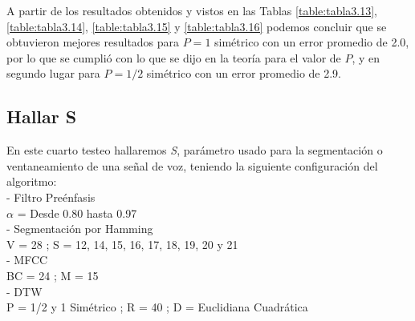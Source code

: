 \vskip 1cm
A partir de los resultados obtenidos y vistos en las Tablas \ref{table:tabla3.13}, \ref{table:tabla3.14}, \ref{table:tabla3.15} y \ref{table:tabla3.16} podemos concluir que se obtuvieron mejores resultados para $P = 1$ simétrico con un error promedio de 2.0, por lo que se cumplió con lo que se dijo en la teoría para el valor de $P$, y en segundo lugar para $P = 1/2$ simétrico con un error promedio de 2.9.

\subsection{Hallar S}
En este cuarto testeo hallaremos \textit{S}, parámetro usado para la segmentación o ventaneamiento de una señal de voz, teniendo la siguiente configuración del algoritmo: \\
- Filtro Preénfasis \\
\hspace*{1cm} $\alpha$ = Desde 0.80 hasta 0.97 \\
- Segmentación por Hamming \\
\hspace*{1cm} V = 28 ; \qquad S = 12, 14, 15, 16, 17, 18, 19, 20 y 21 \\
- MFCC \\
\hspace*{1cm} BC = 24 ; \qquad M = 15 \\
- DTW \\
\hspace*{1cm} P = 1/2 y 1 Simétrico ; \qquad R = 40 ; \qquad D = Euclidiana Cuadrática \\

